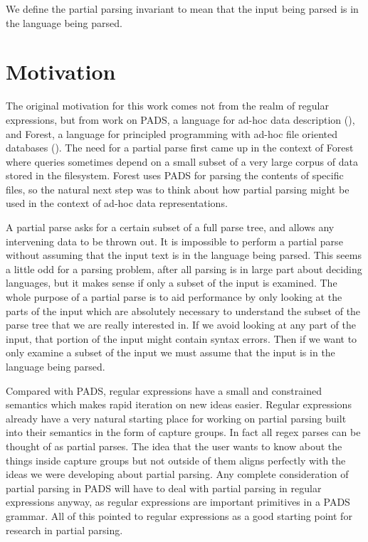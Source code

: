 We define the partial parsing invariant to mean that the
input being parsed is in the language being parsed.

\section{Motivation}

The original motivation for this work comes not from the realm of
regular expressions, but from work on PADS, a language for ad-hoc
data description (\cite{Fisher2005}), and Forest, a language for
principled programming with ad-hoc file oriented databases
(\cite{Fisher2011}). The need for a partial parse first
came up in the context of Forest where queries sometimes depend on
a small subset of a very large corpus of data stored in the filesystem.
Forest uses PADS for parsing the contents of specific files, so the
natural next step was to think about how partial parsing might
be used in the context of ad-hoc data representations.

A partial parse asks for a certain subset of a full parse tree,
and allows any intervening data to be thrown out. It is impossible
to perform a partial parse without assuming that the input text
is in the language being parsed. This seems a little odd for a
parsing problem, after all parsing is in large part about deciding
languages, but it makes sense if only a subset of the input is
examined. The whole purpose of a partial parse
is to aid performance by only looking at the parts of the input which
are absolutely necessary to understand the subset of the parse tree
that we are really interested in. If we avoid looking at any part of
the input, that portion of the input might contain syntax errors.
Then if we want to only examine a subset of the input we must assume
that the input is in the language being parsed.

Compared with PADS, regular expressions have a small and
constrained semantics which makes rapid iteration on new
ideas easier. Regular expressions already have a very natural
starting place for working on partial parsing built into their
semantics in the form of capture groups. In fact all regex parses
can be thought of as partial parses. The idea that the user wants
to know about the things inside capture groups but not outside of
them aligns perfectly with the ideas we were developing about
partial parsing. Any complete consideration of partial
parsing in PADS will have to deal with partial parsing in regular
expressions anyway, as regular expressions are important primitives in
a PADS grammar. All of this pointed to regular expressions as a good
starting point for research in partial parsing.

